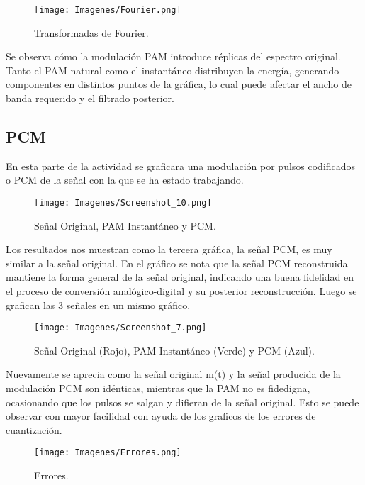 \documentclass[letter,12pt]{article}
\begin{document}
\begin{figure}[H]
        \centering
        \texttt{[image: Imagenes/Fourier.png]}
        \label{fig:a1}
        \caption{Transformadas de Fourier.}
\end{figure}

Se observa cómo la modulación PAM introduce réplicas del espectro original. Tanto el PAM natural como el instantáneo distribuyen la energía, generando componentes en distintos puntos de la gráfica, lo cual puede afectar el ancho de banda requerido y el filtrado posterior.

\subsection{PCM}
En esta parte de la actividad se graficara una modulación por pulsos codificados o PCM de la señal con la que se ha estado trabajando.
\begin{figure}[H]
        \centering
        \texttt{[image: Imagenes/Screenshot\_10.png]}
        \label{fig:a1}
        \caption{Señal Original, PAM Instantáneo y PCM.}
\end{figure}

Los resultados nos muestran como la tercera gráfica, la señal PCM, es muy similar a la señal original. En el gráfico se nota que la señal PCM reconstruida mantiene la forma general de la señal original, indicando una buena fidelidad en el proceso de conversión analógico-digital y su posterior reconstrucción. Luego se grafican las 3 señales en un mismo gráfico.

\begin{figure}[H]
        \centering
        \texttt{[image: Imagenes/Screenshot\_7.png]}
        \label{fig:a1}
        \caption{Señal Original (Rojo), PAM Instantáneo (Verde) y PCM (Azul).}
\end{figure}

Nuevamente se aprecia como la señal original m(t) y la señal producida de la modulación PCM son idénticas, mientras que la PAM no es fidedigna, ocasionando que los pulsos se salgan y difieran de la señal original. Esto se puede observar con mayor facilidad con ayuda de los graficos de los errores de cuantización.
\begin{figure}[H]
        \centering
        \texttt{[image: Imagenes/Errores.png]}
        \label{fig:a1}
        \caption{Errores.}
\end{figure}
\end{document}
